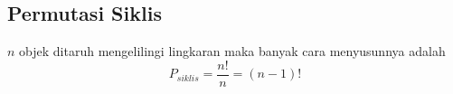 \subsection{Permutasi Siklis}
$n$ objek ditaruh mengelilingi lingkaran maka banyak cara menyusunnya adalah
$$P_{siklis} =\dfrac{n!}{n} = (n-1)!$$

